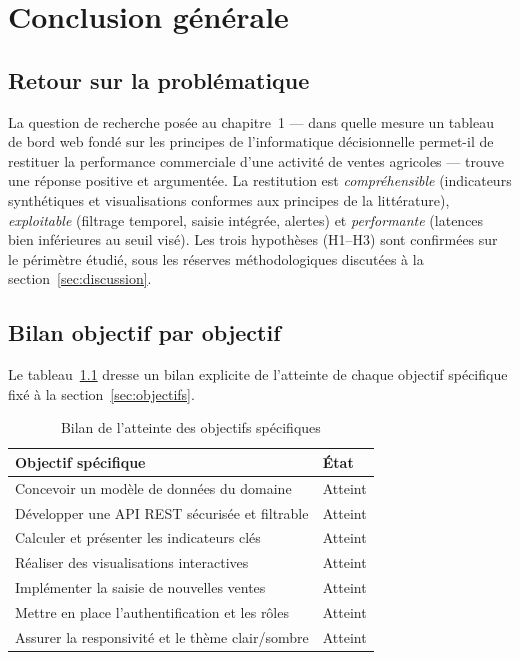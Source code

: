 \documentclass[11pt,a4paper]{report}
\begin{document}
\chapter{Conclusion générale}

\section{Retour sur la problématique}
La question de recherche posée au chapitre~1 — dans quelle mesure un tableau de
bord web fondé sur les principes de l'informatique décisionnelle permet-il de
restituer la performance commerciale d'une activité de ventes agricoles — trouve
une réponse positive et argumentée. La restitution est \emph{compréhensible}
(indicateurs synthétiques et visualisations conformes aux principes de la
littérature), \emph{exploitable} (filtrage temporel, saisie intégrée, alertes)
et \emph{performante} (latences bien inférieures au seuil visé). Les trois
hypothèses (H1--H3) sont confirmées sur le périmètre étudié, sous les réserves
méthodologiques discutées à la section~\ref{sec:discussion}.

\section{Bilan objectif par objectif}
Le tableau~\ref{tab:bilan} dresse un bilan explicite de l'atteinte de chaque
objectif spécifique fixé à la section~\ref{sec:objectifs}.

\begin{table}[H]
\centering
\caption{Bilan de l'atteinte des objectifs spécifiques}
\label{tab:bilan}
\renewcommand{\arraystretch}{1.25}
\begin{tabularx}{\textwidth}{@{}X l@{}}
\toprule
\textbf{Objectif spécifique} & \textbf{État}\\
\midrule
Concevoir un modèle de données du domaine & Atteint\\
Développer une API REST sécurisée et filtrable & Atteint\\
Calculer et présenter les indicateurs clés & Atteint\\
Réaliser des visualisations interactives & Atteint\\
Implémenter la saisie de nouvelles ventes & Atteint\\
Mettre en place l'authentification et les rôles & Atteint\\
Assurer la responsivité et le thème clair/sombre & Atteint\\
\bottomrule
\end{tabularx}
\end{table}
\end{document}
